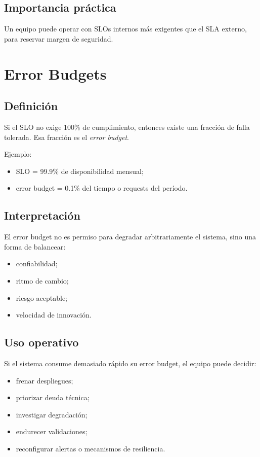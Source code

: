 \documentclass[variant=apuntes,cover=institutional,mode=screen]{ua-engineering-v6-article}
\begin{document}
\subsection{Importancia práctica}

Un equipo puede operar con SLOs internos más exigentes que el SLA externo, para reservar margen de seguridad.

\section{Error Budgets}

\subsection{Definición}

Si el SLO no exige 100\% de cumplimiento, entonces existe una fracción de falla tolerada. Esa fracción es el \emph{error budget}.

Ejemplo:
\begin{itemize}
\item SLO = 99.9\% de disponibilidad mensual;
\item error budget = 0.1\% del tiempo o requests del período.
\end{itemize}

\subsection{Interpretación}

El error budget no es permiso para degradar arbitrariamente el sistema, sino una forma de balancear:
\begin{itemize}
\item confiabilidad;
\item ritmo de cambio;
\item riesgo aceptable;
\item velocidad de innovación.
\end{itemize}

\subsection{Uso operativo}

Si el sistema consume demasiado rápido su error budget, el equipo puede decidir:
\begin{itemize}
\item frenar despliegues;
\item priorizar deuda técnica;
\item investigar degradación;
\item endurecer validaciones;
\item reconfigurar alertas o mecanismos de resiliencia.
\end{itemize}
\end{document}
